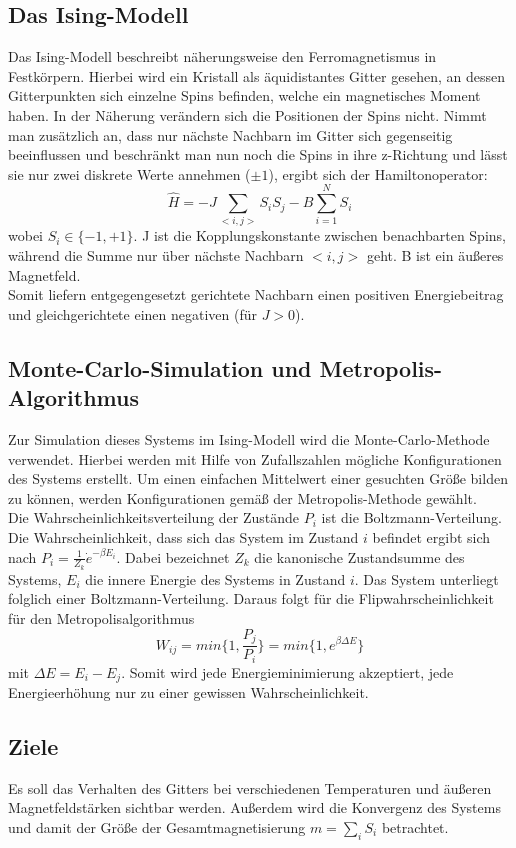 \subsection{Das Ising-Modell}

Das Ising-Modell beschreibt näherungsweise den Ferromagnetismus in Festkörpern. Hierbei wird ein Kristall als äquidistantes Gitter gesehen, an dessen Gitterpunkten sich einzelne Spins befinden, welche ein magnetisches Moment haben. In der Näherung verändern sich die Positionen der Spins nicht. Nimmt man zusätzlich an, dass nur nächste Nachbarn im Gitter sich gegenseitig beeinflussen und beschränkt man nun noch die Spins in ihre z-Richtung und lässt sie nur zwei diskrete Werte annehmen ($\pm1$), ergibt sich der Hamiltonoperator:\\
\[
\hat{H}=-J\sum_{<i,j>} S_i S_j - B\sum_{i=1}^N S_i
\]
wobei $S_i \in \{-1,+1\}$. J ist die Kopplungskonstante zwischen benachbarten Spins, während die Summe nur über nächste Nachbarn $<i,j>$ geht. B ist ein äußeres Magnetfeld.\\
Somit liefern entgegengesetzt gerichtete Nachbarn einen positiven Energiebeitrag und gleichgerichtete einen negativen (für $J>0$).\\

\subsection{Monte-Carlo-Simulation und Metropolis-Algorithmus}
\label{theo2}
Zur Simulation dieses Systems im Ising-Modell wird die Monte-Carlo-Methode verwendet. Hierbei werden mit Hilfe von Zufallszahlen mögliche Konfigurationen des Systems erstellt. Um einen einfachen Mittelwert einer gesuchten Größe bilden zu können, werden Konfigurationen gemäß der Metropolis-Methode gewählt.\\
Die Wahrscheinlichkeitsverteilung der Zustände $P_i$ ist die Boltzmann-Verteilung. Die Wahrscheinlichkeit, dass sich das System im Zustand $i$ befindet ergibt sich nach $P_{i}=\frac{1}{Z_{k}}\dot e^{-\beta E_{i}}$. Dabei bezeichnet $Z_{k}$ die kanonische Zustandsumme des Systems, $E_{i}$ die innere Energie des Systems in Zustand $i$. Das System unterliegt folglich einer Boltzmann-Verteilung. Daraus folgt für die Flipwahrscheinlichkeit für den Metropolisalgorithmus
\begin{equation}
W_{ij}=min\{1,\frac{P_{j}}{P_{i}}\}=min\{1,e^{\beta \Delta E}\}
\end{equation}
mit $\Delta E=E_{i}-E_{j}$. Somit wird jede Energieminimierung akzeptiert, jede Energieerhöhung nur zu einer gewissen Wahrscheinlichkeit.


\subsection{Ziele}

Es soll das Verhalten des Gitters bei verschiedenen Temperaturen und äußeren Magnetfeldstärken sichtbar werden. Außerdem wird die Konvergenz des Systems und damit der Größe der Gesamtmagnetisierung $m=\sum_i S_i$ betrachtet.